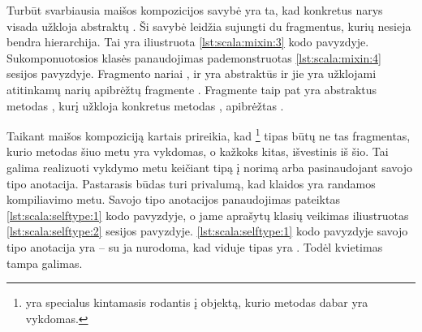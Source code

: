 
Turbūt svarbiausia maišos kompozicijos savybė yra ta, kad konkretus
narys visada užkloja abstraktų
\cite[6]{scalable-component-abstractions}. Ši savybė leidžia
sujungti du fragmentus, kurių nesieja bendra hierarchija. Tai yra
iliustruota \ref{lst:scala:mixin:3} kodo pavyzdyje.
Sukomponuotosios klasės  panaudojimas
pademonstruotas \ref{lst:scala:mixin:4}  sesijos
pavyzdyje. Fragmento  nariai
,  ir  yra abstraktūs
ir jie yra užklojami atitinkamų narių apibrėžtų fragmente
. Fragmente  taip pat yra
abstraktus metodas , kurį užkloja konkretus metodas
, apibrėžtas .


Taikant maišos kompoziciją kartais prireikia, kad
\footnote{ yra specialus kintamasis rodantis į
objektą, kurio metodas dabar yra vykdomas.} tipas būtų ne tas fragmentas,
kurio metodas šiuo metu yra vykdomas, o kažkoks kitas, išvestinis
iš šio. Tai galima realizuoti vykdymo metu keičiant 
tipą į norimą arba pasinaudojant  savojo tipo
anotacija. Pastarasis būdas turi privalumą, kad klaidos yra randamos
kompiliavimo metu. Savojo tipo anotacijos panaudojimas pateiktas
\ref{lst:scala:selftype:1} kodo pavyzdyje, o jame aprašytų klasių
veikimas iliustruotas \ref{lst:scala:selftype:2} 
sesijos pavyzdyje. \ref{lst:scala:selftype:1} kodo pavyzdyje savojo tipo
anotacija yra  – su ja nurodoma, kad
 viduje  tipas yra . Todėl
kvietimas  tampa galimas.


